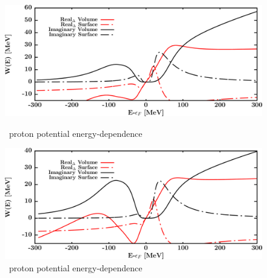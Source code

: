 \begin{figure}[H]
    \centering
    \begin{minipage}{0.45\textwidth}
        \centering
        \includegraphics[width=1.0\textwidth]{figures/sn112_protonPotentials.png}
        \caption{\snTwelve\ proton potential energy-dependence}
        \label{DOMFitData_sn112_proton_potentialComponent_energy}
    \end{minipage}\hfill
    \begin{minipage}{0.45\textwidth}
        \centering
        \includegraphics[width=1.0\textwidth]{figures/sn112_neutronPotentials.png}
        \caption{\snTwelve\ proton potential energy-dependence}
        \label{DOMFitData_sn112_neutron_potentialComponent_energy}
    \end{minipage}
\end{figure}

